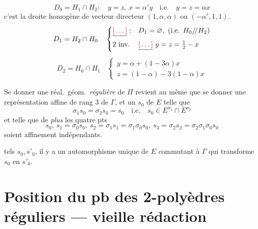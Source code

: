 \documentclass[11pt,a4paper]{article}
\begin{document}
\[
D_0 = H_1 \cap H_2 : \quad y = z,\ x = \alpha' y \quad\text{i.e.}\quad y = z = \alpha x
\]
c'est la droite homogène de vecteur directeur $(1, \alpha, \alpha)$ ou $(-\alpha', 1, 1)$.
\[
D_1 = H_2 \cap H_0 \quad
\begin{cases}
\struck{\ill{}} : & D_1 = \varnothing,\ (\text{i.e. } H_0 /\!/ H_2) \\
2 \text{ inv.} & \struck{\ill{}}\ y = z = \tfrac{1}{2} - x
\end{cases}
\]
\[
D_2 = H_0 \cap H_1 \quad
\begin{cases}
y = \alpha + (1 - 3\alpha)x \\
z = (1 - \alpha) - 3(1 - \alpha)x
\end{cases}
\]

Se donner une réal.\ géom.\ \emph{régulière} de $\Pi$ revient au même que se donner une représentation affine de rang 3 de $\Gamma$,  et un   $s_0$ de $E$ telle que
\[
\sigma_1 s_0 = \sigma_2 s_0 = s_0 \quad\text{i.e.}\quad s_0 \in E^{\sigma_1} \cap E^{\sigma_2}
\]
et telle que de \emph{plus} les quatre pts
\[
s_0,\ s_1 = \sigma_0 s_0,\ s_2 = \sigma_1 s_1 = \sigma_1\sigma_0 s_0,\ s_3 = \sigma_2 s_2 = \sigma_2\sigma_1\sigma_0 s_0
\]
soient affinement indépendants. \struck{\ill{}}

 \emph{} tels $s_0, s'_0$, il y a un automorphisme unique de $E$ commutant à $\Gamma$ qui transforme $s_0$ en $s'_0$.


\section{Position du pb des 2-polyèdres réguliers — vieille rédaction}
\end{document}

